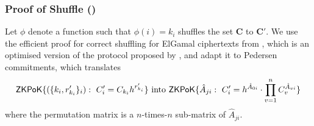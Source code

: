 \subsubsection{Proof of Shuffle (\PoS)}
Let $\phi$ denote a function such that $\phi(i)=k_i$ shuffles the set $\bm C$ to $\bm C'$.
We use the efficient proof for correct shuffling for ElGamal ciphertexts from \citet{Furukawa05}, which is an optimised version of the protocol proposed by \citet{FurukawaS01}, and adapt it to Pedersen commitments, which translates
\[
  \mathsf{ZKPoK}\{(\{k_i, r'_{k_i}\}_{i}) : ~ C'_{i}=C_{k_i}h^{r'_{k_i}}\}
\text{ into }
  \mathsf{ZKPoK}\{\hat{A}_{ji}:~ C'_i=h^{\hat{A}_{0i}}\cdot\prod_{v=1}^n C_v^{\hat{A}_{vi}}\}
\]
where the permutation matrix is a $n$-times-$n$ sub-matrix of $\hat{A}_{ji}$.

